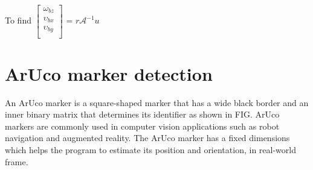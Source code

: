 \documentclass[12pt, twoside]{report}
\begin{document}
To find
$
    \begin{bmatrix}
        \omega_{bz}   \\
        \upsilon_{bx} \\
        \upsilon_{by} \\
    \end{bmatrix}
$ = $r\mathcal{A}^{-1} u$


\newpage

\section*{ArUco marker detection}

An ArUco marker is a square-shaped marker that has a wide black border and an inner
binary matrix that determines its identifier as shown in FIG. ArUco markers are commonly
used in computer vision applications such as robot navigation and augmented reality.
The ArUco marker has a fixed dimensions which helps the program to estimate its position and orientation, in real-world frame.
\end{document}
